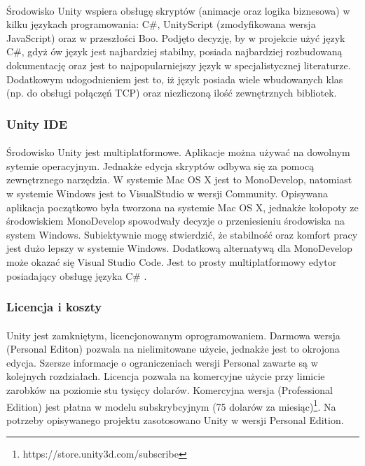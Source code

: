 \paragraph{}
Środowisko Unity wspiera obsługę skryptów (animacje oraz logika biznesowa) w kilku językach programowania: C\#, UnityScript (zmodyfikowana wersja JavaScript)  oraz w przeszłości Boo. Podjęto decyzję, by w projekcie użyć język C\#, gdyż ów język jest najbardziej stabilny, posiada najbardziej rozbudowaną dokumentację oraz jest to najpopularniejszy język w specjalistycznej literaturze. Dodatkowym udogodnieniem  jest to, iż  język posiada wiele wbudowanych klas (np. do obsługi połączęń TCP) oraz niezliczoną ilość zewnętrznych bibliotek.
\subsubsection{Unity IDE}
\paragraph{}
Środowisko Unity jest multiplatformowe. Aplikacje można używać na dowolnym sytemie operacyjnym. Jednakże edycja skryptów odbywa się za pomocą zewnętrznego narzędzia. W systemie Mac OS X jest to MonoDevelop, natomiast w systemie Windows jest to VisualStudio w wersji Community. Opisywana aplikacja początkowo była tworzona na systemie Mac OS X, jednakże kołopoty ze środowiskiem MonoDevelop spowodwały decyzje o przeniesieniu środowiska na system Windows. Subiektywnie mogę stwierdzić, że stabilność oraz komfort pracy jest dużo lepszy w systemie Windows.
Dodatkową alternatywą dla MonoDevelop może okazać się Visual Studio Code. Jest to prosty multiplatformowy edytor posiadający obsługę języka C\# .

\subsubsection{Licencja i koszty}
\paragraph{}
Unity jest zamkniętym, licencjonowanym oprogramowaniem. Darmowa wersja (Personal Editon) pozwala na nielimitowane użycie, jednakże jest to okrojona edycja. Szersze informacje o ograniczeniach wersji Personal zawarte są w kolejnych rozdziałach. Licencja pozwala na komercyjne użycie przy limicie zarobków na poziomie stu tysięcy dolarów.
Komercyjna wersja (Professional Edition) jest płatna w modelu subskrybcyjnym (75 dolarów za miesiąc)\footnote{https://store.unity3d.com/subscribe}.
Na potrzeby opisywanego projektu zasotosowano Unity w wersji Personal Edition.

